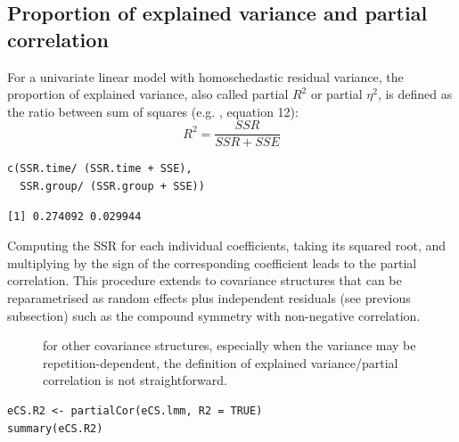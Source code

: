 \documentclass[12pt]{article}
\newcommand\Warning[1][3ex]{%
\renewcommand\stacktype{L}%
\scaleto{\stackon[1.3pt]{\color{red}$\triangle$}{\tiny\bfseries !}}{#1}%
\xspace
}
\begin{document}
\subsection{Proportion of explained variance and partial correlation}
\label{sec:org1b78b7b}

For a univariate linear model with homoschedastic residual variance,
the proportion of explained variance, also called partial \(R^2\) or
partial \(\eta^2\), is defined as the ratio between sum of squares
(e.g. \cite{lakens2013calculating}, equation 12):
\[ R^2=\frac{SSR}{SSR + SSE} \]

\lstset{language=r,label= ,caption= ,captionpos=b,numbers=none}
\begin{lstlisting}
c(SSR.time/ (SSR.time + SSE),
  SSR.group/ (SSR.group + SSE))
\end{lstlisting}

\begin{verbatim}
[1] 0.274092 0.029944
\end{verbatim}


Computing the SSR for each individual coefficients, taking its squared
root, and multiplying by the sign of the corresponding coefficient
leads to the partial correlation. This procedure extends to covariance
structures that can be reparametrised as random effects plus
independent residuals (see previous subsection) such as the compound
symmetry with non-negative correlation.
\begin{description}
\item[{\Warning}] for other covariance structures, especially when the
variance may be repetition-dependent, the definition of explained
variance/partial correlation is not straightforward.
\end{description}
\lstset{language=r,label= ,caption= ,captionpos=b,numbers=none}
\begin{lstlisting}
eCS.R2 <- partialCor(eCS.lmm, R2 = TRUE)
summary(eCS.R2)
\end{lstlisting}
\end{document}
